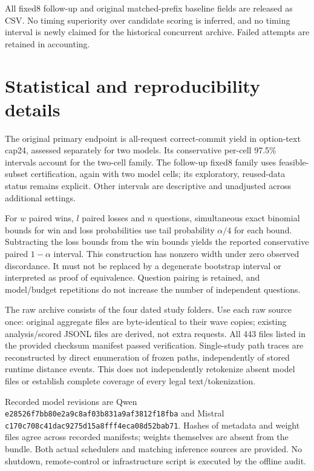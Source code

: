 \documentclass[12pt,a4paper]{article}
\newcommand{\code}[1]{\texttt{#1}}
\begin{document}
All fixed8 follow-up and original matched-prefix baseline fields are released as CSV. No timing superiority over candidate scoring is inferred, and no timing interval is newly claimed for the historical concurrent archive. Failed attempts are retained in accounting.

\section{Statistical and reproducibility details}
The original primary endpoint is all-request correct-commit yield in option-text cap24, assessed separately for two models. Its conservative per-cell 97.5\% intervals account for the two-cell family. The follow-up fixed8 family uses feasible-subset certification, again with two model cells; its exploratory, reused-data status remains explicit. Other intervals are descriptive and unadjusted across additional settings.

For $w$ paired wins, $l$ paired losses and $n$ questions, simultaneous exact binomial bounds for win and loss probabilities use tail probability $\alpha/4$ for each bound. Subtracting the loss bounds from the win bounds yields the reported conservative paired $1-\alpha$ interval. This construction has nonzero width under zero observed discordance. It must not be replaced by a degenerate bootstrap interval or interpreted as proof of equivalence. Question pairing is retained, and model/budget repetitions do not increase the number of independent questions.

The raw archive consists of the four dated study folders. Use each raw source once: original aggregate files are byte-identical to their wave copies; existing analysis/scored JSONL files are derived, not extra requests. All 443 files listed in the provided checksum manifest passed verification. Single-study path traces are reconstructed by direct enumeration of frozen paths, independently of stored runtime distance events. This does not independently retokenize absent model files or establish complete coverage of every legal text/tokenization.

Recorded model revisions are Qwen \code{e28526f7bb80e2a9c8af03b831a9af3812f18fba} and Mistral \code{c170c708c41dac9275d15a8fff4eca08d52bab71}. Hashes of metadata and weight files agree across recorded manifests; weights themselves are absent from the bundle. Both actual schedulers and matching inference sources are provided. No shutdown, remote-control or infrastructure script is executed by the offline audit.
\end{document}
